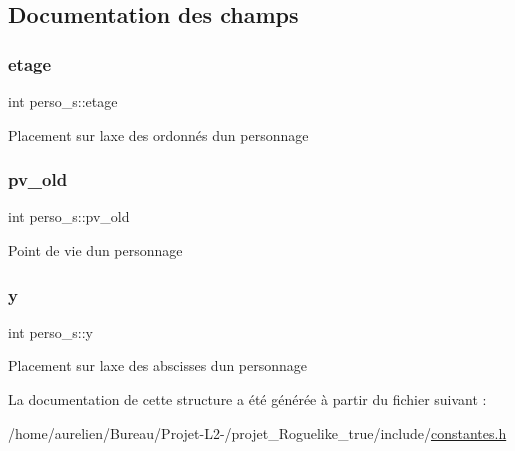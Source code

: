 \subsection{Documentation des champs}
\mbox{\label{structperso__s_a833e982a2a21762795c06ebbc0061f32}} 
\subsubsection{\texorpdfstring{etage}{etage}}
{\footnotesize\ttfamily int perso\+\_\+s\+::etage}

Placement sur l\textquotesingle{}axe des ordonnés d\textquotesingle{}un personnage \mbox{\label{structperso__s_a297466e7436287f164f8657682eed1cc}} 
\subsubsection{\texorpdfstring{pv\+\_\+old}{pv\_old}}
{\footnotesize\ttfamily int perso\+\_\+s\+::pv\+\_\+old}

Point de vie d\textquotesingle{}un personnage \mbox{\label{structperso__s_a74f226bdc5f8237c573fa5f54d10a44e}} 
\subsubsection{\texorpdfstring{y}{y}}
{\footnotesize\ttfamily int perso\+\_\+s\+::y}

Placement sur l\textquotesingle{}axe des abscisses d\textquotesingle{}un personnage 

La documentation de cette structure a été générée à partir du fichier suivant \+:\begin{DoxyCompactItemize}
\item 
/home/aurelien/\+Bureau/\+Projet-\/\+L2-\//projet\+\_\+\+Roguelike\+\_\+true/include/\hyperlink{constantes_8h}{constantes.\+h}\end{DoxyCompactItemize}
